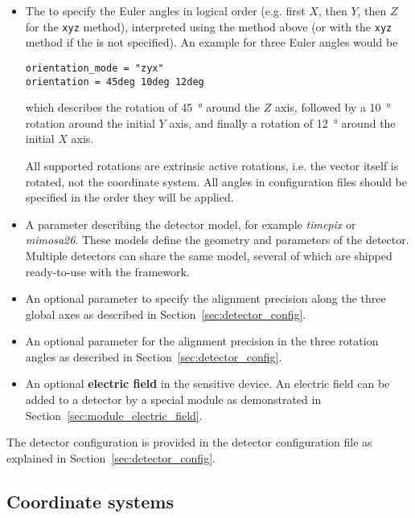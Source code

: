 \begin{itemize}
\item The  to specify the Euler angles in logical order (e.g. first $X$, then $Y$, then $Z$ for the \texttt{xyz} method), interpreted using the method above (or with the \texttt{xyz} method if the  is not specified). An example for three Euler angles would be
\begin{verbatim}
orientation_mode = "zyx"
orientation = 45deg 10deg 12deg
\end{verbatim}
which describes the rotation of \SI{45}{\degree} around the $Z$ axis, followed by a \SI{10}{\degree} rotation around the initial $Y$ axis, and finally a rotation of \SI{12}{\degree} around the initial $X$ axis.
\begin{warning}
All supported rotations are extrinsic active rotations, i.e. the vector itself is rotated, not the coordinate system. All angles in configuration files should be specified in the order they will be applied.
\end{warning}

\item A  parameter describing the detector model, for example \emph{timepix} or \emph{mimosa26}.
These models define the geometry and parameters of the detector.
Multiple detectors can share the same model, several of which are shipped ready-to-use with the framework.
\item An optional parameter  to specify the alignment precision along the three global axes as described in Section~\ref{sec:detector_config}.
\item An optional parameter  for the alignment precision in the three rotation angles as described in Section~\ref{sec:detector_config}.
\item An optional \textbf{electric field} in the sensitive device.
An electric field can be added to a detector by a special module as demonstrated in Section~\ref{sec:module_electric_field}.
\end{itemize}
The detector configuration is provided in the detector configuration file as explained in Section~\ref{sec:detector_config}.

\subsection{Coordinate systems}
\label{sec:coordinate_systems}

